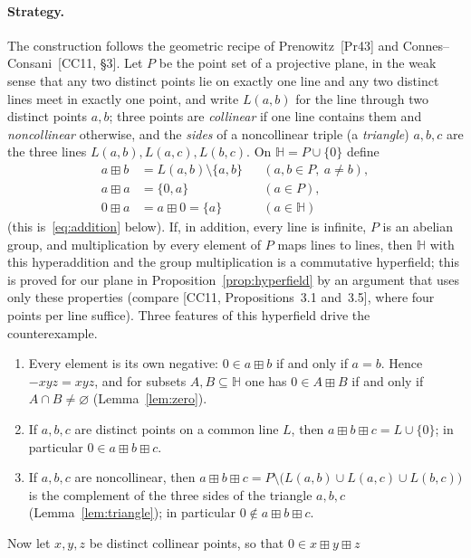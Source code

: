 \documentclass[11pt]{article}
\theoremstyle{plain}
\theoremstyle{definition}
\newcommand{\Hh}{\mathbb{H}}
\newcommand{\bp}{\boxplus}
\begin{document}
\paragraph{Strategy.}
The construction follows the geometric recipe of Prenowitz~[Pr43] and
Connes--Consani~[CC11, \S3].  Let $P$ be the point set of a projective
plane, in the weak sense that any two distinct points lie on exactly one
line and any two distinct lines meet in exactly one point, and write
$L(a,b)$ for the line through two distinct points $a,b$; three points
are \emph{collinear} if one line contains them and \emph{noncollinear}
otherwise, and the \emph{sides} of a noncollinear triple (a
\emph{triangle}) $a,b,c$ are the three lines $L(a,b),L(a,c),L(b,c)$.
On $\Hh=P\cup\{0\}$ define
\[
 \begin{aligned}
 a\bp b&=L(a,b)\setminus\{a,b\} &&(a,b\in P,\ a\neq b),\\
 a\bp a&=\{0,a\} &&(a\in P),\\
 0\bp a&=a\bp0=\{a\} &&(a\in\Hh)
 \end{aligned}
\]
(this is~\eqref{eq:addition} below).  If, in addition, every line is
infinite, $P$ is an abelian group, and
multiplication by every element of $P$ maps lines to lines, then $\Hh$
with this hyperaddition and the group multiplication is a commutative
hyperfield; this is proved for our plane in
Proposition~\ref{prop:hyperfield} by an argument that uses only these
properties (compare [CC11, Propositions~3.1 and~3.5], where four points
per line suffice).  Three features of this hyperfield drive the
counterexample.
\begin{enumerate}
\item[(a)] Every element is its own negative: $0\in a\bp b$ if and only
if $a=b$.  Hence $-xyz=xyz$, and for subsets $A,B\subseteq\Hh$ one has
$0\in A\bp B$ if and only if $A\cap B\neq\varnothing$
(Lemma~\ref{lem:zero}).
\item[(b)] If $a,b,c$ are distinct points on a common line $L$, then
$a\bp b\bp c=L\cup\{0\}$; in particular $0\in a\bp b\bp c$.
\item[(c)] If $a,b,c$ are noncollinear, then
$a\bp b\bp c=P\setminus\bigl(L(a,b)\cup L(a,c)\cup L(b,c)\bigr)$ is
the complement of the three sides of the triangle $a,b,c$
(Lemma~\ref{lem:triangle}); in particular $0\notin a\bp b\bp c$.
\end{enumerate}
Now let $x,y,z$ be distinct collinear points, so that $0\in x\bp y\bp z$
\end{document}
